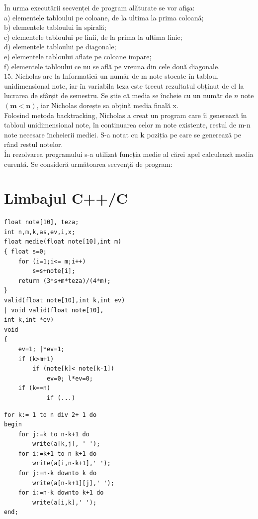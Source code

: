 \documentclass[10pt]{article}
\begin{document}
În urma executării secvenței de program alăturate se vor afişa:\\
a) elementele tabloului pe coloane, de la ultima la prima coloană;\\
b) elementele tabloului în spirală;\\
c) elementele tabloului pe linii, de la prima la ultima linie;\\
d) elementele tabloului pe diagonale;\\
e) elementele tabloului aflate pe coloane impare;\\
f) elementele tabloului ce nu se află pe vreuna din cele două diagonale.\\
15. Nicholas are la Informatică un număr de m note stocate în tabloul unidimensional note, iar în variabila teza este trecut rezultatul obținut de el la lucrarea de sfârșit de semestru. Se știe că media se încheie cu un număr de $n$ note $(\mathbf{m}<\mathbf{n})$, iar Nicholas dorește sa obțină media finală x.\\
Folosind metoda backtracking, Nicholas a creat un program care îi generează în tabloul unidimensional note, în continuarea celor m note existente, restul de m-n note necesare încheierii mediei. S-a notat cu $\mathbf{k}$ poziția pe care se generează pe rând restul notelor.\\
În rezolvarea programului s-a utilizat funcția medie al cărei apel calculează media curentă. Se consideră următoarea secvență de program:

\section*{Limbajul C++/C}
\begin{verbatim}
float note[10], teza;
int n,m,k,as,ev,i,x;
float medie(float note[10],int m)
{ float s=0;
    for (i=1;i<= m;i++)
        s=s+note[i];
    return (3*s+m*teza)/(4*m);
}
valid(float note[10],int k,int ev)
| void valid(float note[10],
int k,int *ev)
void
{
    ev=1; |*ev=1;
    if (k>m+1)
        if (note[k]< note[k-1])
            ev=0; l*ev=0;
    if (k==n)
            if (...)
\end{verbatim}

\begin{verbatim}
for k:= 1 to n div 2+ 1 do
begin
    for j:=k to n-k+1 do
        write(a[k,j], ' ');
    for i:=k+1 to n-k+1 do
        write(a[i,n-k+1],' ');
    for j:=n-k downto k do
        write(a[n-k+1][j],' ');
    for i:=n-k downto k+1 do
        write(a[i,k],' ');
end;
\end{verbatim}
\end{document}

